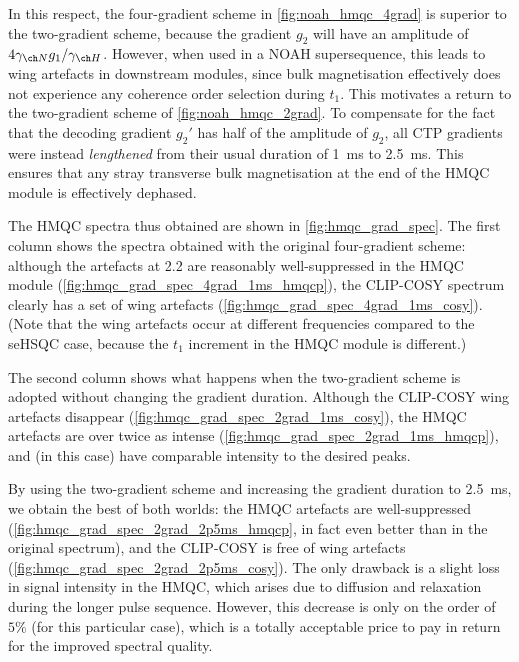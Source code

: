 In this respect, the four-gradient scheme in \cref{fig:noah_hmqc_4grad} is superior to the two-gradient scheme, because the gradient $g_2$ will have an amplitude of $4\gammaN g_1/\gammaH$.
However, when used in a NOAH supersequence, this leads to wing artefacts in downstream modules, since bulk  magnetisation effectively does not experience any coherence order selection during $t_1$.
This motivates a return to the two-gradient scheme of \cref{fig:noah_hmqc_2grad}.
To compensate for the fact that the decoding gradient $g_2'$ has half of the amplitude of $g_2$, all CTP gradients were instead \textit{lengthened} from their usual duration of \qty{1}{\ms} to \qty{2.5}{\ms}.
This ensures that any stray transverse bulk magnetisation at the end of the HMQC module is effectively dephased.

The HMQC spectra thus obtained are shown in \cref{fig:hmqc_grad_spec}.
The first column shows the spectra obtained with the original four-gradient scheme: although the artefacts at \qty{2.2}{\ppm} are reasonably well-suppressed in the HMQC module (\cref{fig:hmqc_grad_spec_4grad_1ms_hmqcp}), the CLIP-COSY spectrum clearly has a set of wing artefacts (\cref{fig:hmqc_grad_spec_4grad_1ms_cosy}).
(Note that the wing artefacts occur at different frequencies compared to the \carbon{} seHSQC case, because the $t_1$ increment in the \nitrogen{} HMQC module is different.)

The second column shows what happens when the two-gradient scheme is adopted without changing the gradient duration.
Although the CLIP-COSY wing artefacts disappear (\cref{fig:hmqc_grad_spec_2grad_1ms_cosy}), the HMQC artefacts are over twice as intense (\cref{fig:hmqc_grad_spec_2grad_1ms_hmqcp}), and (in this case) have comparable intensity to the desired peaks.

By using the two-gradient scheme and increasing the gradient duration to \qty{2.5}{\ms}, we obtain the best of both worlds: the HMQC artefacts are well-suppressed (\cref{fig:hmqc_grad_spec_2grad_2p5ms_hmqcp}, in fact even better than in the original spectrum), and the CLIP-COSY is free of wing artefacts (\cref{fig:hmqc_grad_spec_2grad_2p5ms_cosy}).
The only drawback is a slight loss in signal intensity in the HMQC, which arises due to diffusion and relaxation during the longer pulse sequence.
However, this decrease is only on the order of $5\%$ (for this particular case), which is a totally acceptable price to pay in return for the improved spectral quality.

